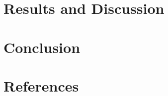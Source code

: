 \documentclass{ieeeaccess}
\begin{document}
\section{Results and Discussion}
\label{sec:res}


\section{Conclusion}
\label{sec:con}


\section{References}

\EOD
\end{document}
